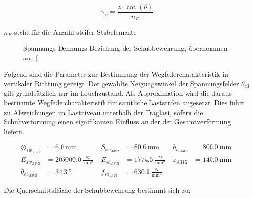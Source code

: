 \documentclass[
  11pt,
  letterpaper,
]{scrreprt}
\begin{document}
\[
\gamma_{E} = \frac{z \cdot \cot(\theta)}{n_{E}}
\]

\(n_{E}\) steht für die Anzahl steifer Stabelemente

\begin{figure}[H]


\caption{\label{fig-sigma-eps-a3v2}Spannungs-Dehnungs-Beziehung der
Schubbewehrung, übernommen aus
{[}\citeproc{ref-gitz_ansatze_2024}{1}{]}}

\end{figure}%

Folgend sind die Parameter zur Bestimmung der Wegfedercharakteristik in
vertikaler Richtung gezeigt. Der gewählte Neigungswinkel der
Spannungsfelder \(\theta_{c3}\) gilt grundsätzlich nur im Bruchzustand.
Als Approximation wird die daraus bestimmte Wegfedercharakteristik für
sämtliche Laststufen angesetzt. Dies führt zu Abweichungen im Lastniveau
unterhalb der Traglast, sofern die Schubverformung einen signifikanten
Einfluss an der der Gesamtverformung liefern.

$$
\begin{aligned}
\oslash_{sw_{A3V2}} &= 6.0\ \mathrm{mm} \; 
 &S_{sw_{A3V2}} &= 80.0\ \mathrm{mm} \; 
 &b_{w_{A3V2}} &= 800.0\ \mathrm{mm} \; 
\\[12pt]
 E_{sw_{A3V2}} &= 205000.0\ \frac{\mathrm{N}}{\mathrm{mm}^{2}} \; 
 &E_{sh_{A3V2}} &= 1774.5\ \frac{\mathrm{N}}{\mathrm{mm}^{2}} \; 
 &z_{A3V2} &= 140.0\ \mathrm{mm} \; 
\\[12pt]
 \theta_{c3_{A3V2}} &= 34.3\ \mathrm{°} \; 
 &f_{su_{A3V2}} &= 630.0\ \frac{\mathrm{N}}{\mathrm{mm}^{2}} \;
\end{aligned}
$$

Die Querschnittsfläche der Schubbewehrung bestimmt sich zu:
\end{document}
